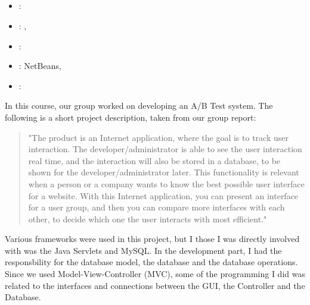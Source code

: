 \subsection[Applied Computer Science Project]{}
\label{sec:appl_comp_sci_proj}
\begin{itemize} 
	\item {}: 
	\item {}: , 
	\item {}: 
	\item {}: NetBeans, 
	\item {}: 
\end{itemize} 
In this course, our group worked on developing an A/B Test system. 
The following is a short project description, taken from our group report:
\begin{quote} 
"The product is an Internet application, where the goal is to track user interaction. 
The developer/administrator is able to see the user interaction real time, and the interaction will also be stored in a database, to be shown for the developer/administrator later. 
This functionality is relevant when a person or a company wants to know the best possible user interface for a website.
With this Internet application, you can present an interface for a user group, and then you can compare more interfaces with each other, 
to decide which one the user interacts with most efficient."
\end{quote}
Various frameworks were used in this project, but I those I was directly involved with was the Java Servlets and MySQL. 
In the development part, I had the responsbility for the database model, the database and the database operations. 
Since we used Model-View-Controller (MVC), some of the programming I did was related to the interfaces and connections between the GUI, the Controller and the Database.

